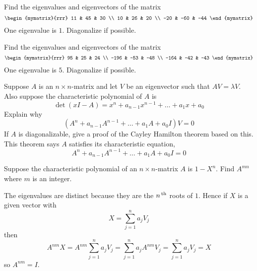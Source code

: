 \begin{enumialphparenastyle}
\begin{ex} Find the eigenvalues and eigenvectors of the matrix 
\begin{equation*}
\begin{mymatrix}{rrr}
11 & 45 & 30 \\
10 & 26 & 20 \\
-20 & -60 & -44
\end{mymatrix}
\end{equation*}
One eigenvalue is $1$. Diagonalize if possible.
\end{ex}

\begin{ex} Find the eigenvalues and eigenvectors of the matrix  
\begin{equation*}
\begin{mymatrix}{rrr}
95 & 25 & 24 \\
-196 & -53 & -48 \\
-164 & -42 & -43
\end{mymatrix}
\end{equation*}
One eigenvalue is $5$. Diagonalize if possible.
\end{ex}

\begin{ex} Suppose $A$ is an $n\times n$-matrix and let $V$ be an
eigenvector such that $AV=\lambda V$. Also suppose the
characteristic polynomial of $A$ is
\begin{equation*}
\det (x I-A) =x ^{n}+a_{n-1} x ^{n-1}+\ldots+a_{1}x +a_{0}
\end{equation*}
Explain why
\begin{equation*}
(A^{n}+a_{n-1}A^{n-1}+\ldots +a_{1}A+a_{0}I) V=0
\end{equation*}
If $A$ is diagonalizable, give a proof of the Cayley Hamilton
theorem based on this. This theorem says $A$ satisfies its
characteristic equation,
\begin{equation*}
A^{n}+a_{n-1}A^{n-1}+\ldots +a_{1}A+a_{0}I=0
\end{equation*} 
\end{ex}

\begin{ex} Suppose the characteristic polynomial of an $n\times n$-matrix $A$ is 
$1-X ^{n}$. Find $A^{mn}$ where $m$ is an integer. 
\begin{sol}
The eigenvalues are distinct because
they are the $n^{\,\rm th}$ roots of $1$. Hence if $X$ is a given vector with
\[
X=\sum_{j=1}^{n}a_{j}V_{j}
\]
then
\[
A^{nm}X=A^{nm}\sum_{j=1}^{n}a_{j}V_{j}=
\sum_{j=1}^{n}a_{j}A^{nm}V_{j}=\sum_{j=1}^{n}a_{j}V_{j}=X
\]
so $A^{nm}=I$.
\end{sol}
\end{ex}

\end{enumialphparenastyle}
